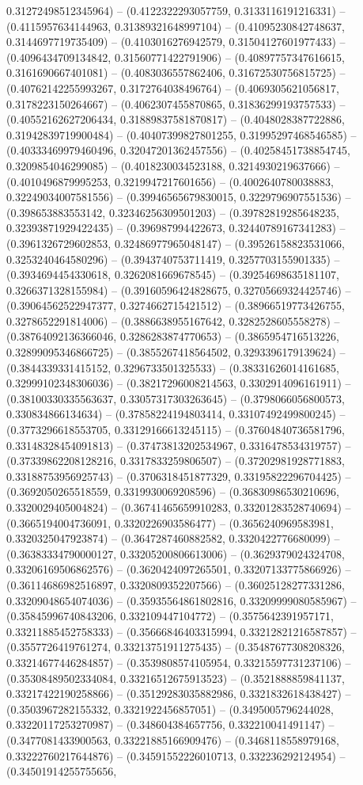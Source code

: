 0.31272498512345964) -- (0.4122322293057759, 0.3133116191216331) -- (0.4115957634144963, 0.31389321648997104) -- (0.41095230842748637, 0.3144697719735409) -- (0.4103016276942579, 0.31504127601977433) -- (0.4096434709134842, 0.31560771422791906) -- (0.40897757347616615, 0.3161690667401081) -- (0.4083036557862406, 0.31672530756815725) -- (0.40762142255993267, 0.3172764038496764) -- (0.4069305621056817, 0.3178223150264667) -- (0.4062307455870865, 0.31836299193757533) -- (0.40552162627206434, 0.31889837581870817) -- (0.4048028387722886, 0.31942839719900484) -- (0.40407399827801255, 0.31995297468546585) -- (0.40333469979460496, 0.32047201362457556) -- (0.40258451738854745, 0.3209854046299085) -- (0.4018230034523188, 0.3214930219637666) -- (0.4010496879995253, 0.3219947217601656) -- (0.4002640780038883, 0.32249034007581556) -- (0.39946565679830015, 0.3229796907551536) -- (0.398653883553142, 0.32346256309501203) -- (0.39782819285648235, 0.32393871929422435) -- (0.396987994422673, 0.32440789167341283) -- (0.3961326729602853, 0.32486977965048147) -- (0.39526158823531066, 0.3253240464580296) -- (0.3943740753711419, 0.3257703155901335) -- (0.3934694454330618, 0.3262081669678545) -- (0.39254698635181107, 0.3266371328155984) -- (0.39160596424828675, 0.32705669324425746) -- (0.39064562522947377, 0.3274662715421512) -- (0.38966519773426755, 0.3278652291814006) -- (0.3886638955167642, 0.3282528605558278) -- (0.38764092136366046, 0.3286283874770653) -- (0.3865954716513226, 0.32899095346866725) -- (0.3855267418564502, 0.3293396179139624) -- (0.3844339331415152, 0.3296733501325533) -- (0.38331626014161685, 0.32999102348306036) -- (0.38217296008214563, 0.3302914096161911) -- (0.38100330335563637, 0.33057317303263645) -- (0.3798066056800573, 0.330834866134634) -- (0.37858224194803414, 0.33107492499800245) -- (0.3773296618553705, 0.33129166613245115) -- (0.37604840736581796, 0.33148328454091813) -- (0.37473813202534967, 0.3316478534319757) -- (0.37339862208128216, 0.3317833259806507) -- (0.37202981928771883, 0.33188753956925743) -- (0.3706318451877329, 0.33195822296704425) -- (0.3692050265518559, 0.3319930069208596) -- (0.36830986530210696, 0.3320029405004824) -- (0.36741465659910283, 0.33201283528740694) -- (0.3665194004736091, 0.3320226903586477) -- (0.3656240969583981, 0.3320325047923874) -- (0.3647287460882582, 0.3320422776680099) -- (0.36383334790000127, 0.33205200806613006) -- (0.3629379024324708, 0.33206169506862576) -- (0.3620424097265501, 0.33207133775866926) -- (0.36114686982516897, 0.3320809352207566) -- (0.36025128277331286, 0.33209048654074036) -- (0.35935564861802816, 0.33209999080585967) -- (0.35845996740843206, 0.332109447104772) -- (0.3575642391957171, 0.33211885452758333) -- (0.35666846403315994, 0.33212821216587857) -- (0.3557726419761274, 0.33213751911275435) -- (0.35487677308208326, 0.33214677446284857) -- (0.3539808574105954, 0.33215597731237106) -- (0.35308489502334084, 0.33216512675913523) -- (0.3521888859841137, 0.33217422190258866) -- (0.35129283035882986, 0.3321832618438427) -- (0.3503967282155332, 0.3321922456857051) -- (0.3495005796244028, 0.33220117253270987) -- (0.348604384657756, 0.332210041491147) -- (0.3477081433900563, 0.33221885166909476) -- (0.3468118558979168, 0.33222760217644876) -- (0.34591552226010713, 0.332236292124954) -- (0.34501914255755656, 
